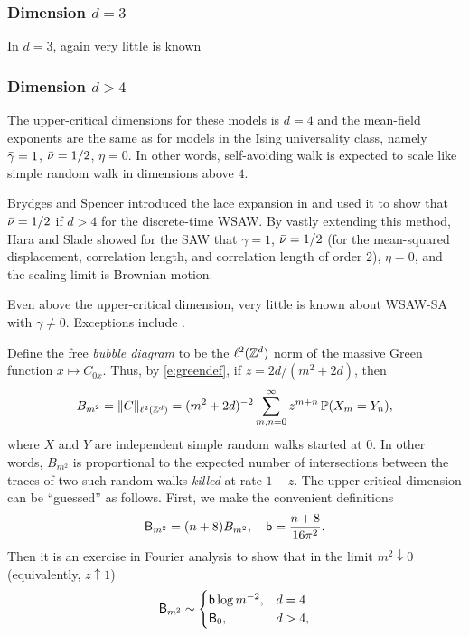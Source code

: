 \subsubsection{Dimension $d = 3$}

In $d = 3$, again very little is known 

\subsubsection{Dimension $d > 4$}

The upper-critical dimensions for these models is $d = 4$ and the mean-field
exponents are the same as for models in the Ising universality class, namely
$\bar\gamma=1$, $\bar\nu = 1/2$, $\eta = 0$. In other words, self-avoiding walk
is expected to scale like simple random walk in dimensions above $4$.

Brydges and Spencer introduced the lace expansion in \cite{BS85} and used it
to show that $\bar\nu = 1/2$ if $d > 4$ for the discrete-time WSAW.
By vastly extending this method, Hara and Slade \cite{HS92a,HS92b} showed for the
SAW that $\gamma = 1$, $\bar\nu = 1/2$ (for the mean-squared displacement, correlation
length, and correlation length of order $2$), $\eta = 0$, and the scaling limit
is Brownian motion.

Even above the upper-critical dimension, very little is known about WSAW-SA with
$\gamma \ne 0$. Exceptions include \cite{HH17,Uelt02}.

\begin{rk}
\label{rk:bubble}
Define the free \emph{bubble diagram} to be the $\ell^2({ {{\mathbb Z}}^d })$ norm of the massive
Green function $x \mapsto C_{0x}$. Thus, by
\eqref{e:greendef}, if $z = 2 d / (m^2 + 2 d)$, then
\begin{equation}
\label{e:bubble-def}
B_{m^2}
	=
\|C\|_{\ell^2({ {{\mathbb Z}}^d })}
	=
(m^2 + 2 d)^{-2} \sum_{m,n=0}^\infty z^{m+n} \operatorname{\mathbb{P}}(X_m = Y_n),
\end{equation}
where $X$ and $Y$ are independent simple random walks started at $0$. In other words,
$B_{m^2}$ is proportional to the expected number of intersections between the traces of two
such random walks \emph{killed} at rate $1 - z$. The upper-critical dimension can
be ``guessed'' as follows. First, we make the convenient definitions
\begin{equation}
\label{e:bubble}
{\sf B}_{m^2} = (n + 8) B_{m^2},
	\quad
{\sf b} = \frac{n + 8}{16\pi^2}.
\end{equation}
Then it is an exercise in Fourier analysis to show that in the limit $m^2\downarrow0$
(equivalently, $z\uparrow1$)
\begin{equation}
\label{e:bubble-log}
{\sf B}_{m^2}
	\sim
\begin{cases}
{\sf b} \log m^{-2},
	&
d = 4
	\\
{\sf B}_0,
	&
d > 4,
\end{cases}
\end{equation}
\end{rk}

